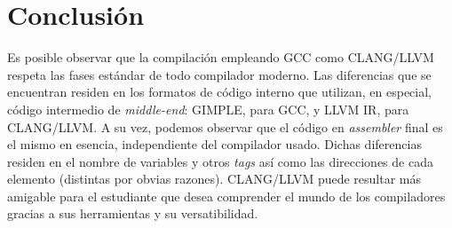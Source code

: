 \chapter{Conclusión}

Es posible observar que la compilación empleando GCC como CLANG/LLVM respeta las
fases estándar de todo compilador moderno. Las diferencias que se encuentran residen en
los formatos de código interno que utilizan, en especial, código intermedio de \emph{middle-end}:
GIMPLE, para GCC, y LLVM IR, para CLANG/LLVM.
A su vez, podemos observar que el código en \emph{assembler} final es el mismo en esencia,
independiente del compilador usado. Dichas diferencias residen en el nombre de variables y
otros \emph{tags} así como las direcciones de cada elemento (distintas por obvias razones).
CLANG/LLVM puede resultar más amigable para el estudiante que desea comprender el mundo de 
los compiladores gracias a sus herramientas y su versatibilidad.

